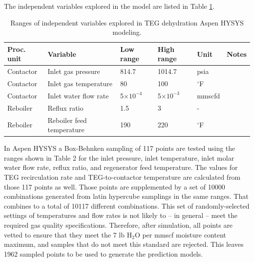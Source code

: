 \documentclass[11pt]{report}
\begin{document}
The independent variables explored in the model are listed in Table \ref{tab:TEG_Aspen_Variables}.

\begin{table}
\begin{scriptsize}
\caption{Ranges of independent variables explored in TEG dehydration Aspen HYSYS modeling.}
\label{tab:TEG_Aspen_Variables}
\begin{tabular*}{1\columnwidth}{p{}p{}p{}p{}p{}p{}}
\toprule
Proc. unit & Variable 				& Low range 	& High range 				& Unit 		& Notes \\
\midrule
Contactor &	Inlet gas pressure 		&	814.7 	& 1014.7				& psia	 	&\\
Contactor &	Inlet gas temperature 	&	80	 	&	100 				& $^\circ$F	 			& \\
Contactor &	Inlet water flow rate 		&	5$\times 10^{-4}$ 		& 5$\times 10^{-3}$  	& mmscfd 	&\\
Reboiler 	&	Reflux ratio 			&	1.5		&	3 				& -				& \\
Reboiler 	&	Reboiler feed temperature &	190		&	220 				& $^\circ$F				& \\
\bottomrule
\end{tabular*}
\end{scriptsize}
\end{table}

In Aspen HYSYS a Box-Behnken sampling of 117 points are tested using the ranges shown in Table 2 for the inlet pressure, inlet temperature, inlet molar water flow rate, reflux ratio, and regenerator feed temperature. The values for TEG recirculation rate and TEG-to-contactor temperature are calculated from those 117 points as well. Those points are supplemented by a set of 10000 combinations generated from latin hypercube samplings in the same ranges. That combines to a total of 10117 different combinations. This set of randomly-selected settings of temperatures and flow rates is not likely to -- in general -- meet the required gas quality specifications. Therefore, after simulation, all points are vetted to ensure that they meet the 7 lb H$_2$O per mmscf moisture content maximum, and samples that do not meet this standard are rejected. This leaves 1962 sampled points to be used to generate the prediction models. 
\end{document}

